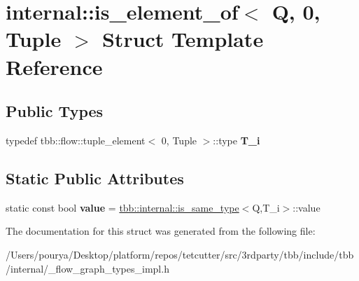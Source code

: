 \hypertarget{structinternal_1_1is__element__of_3_01Q_00_010_00_01Tuple_01_4}{}\section{internal\+:\+:is\+\_\+element\+\_\+of$<$ Q, 0, Tuple $>$ Struct Template Reference}
\label{structinternal_1_1is__element__of_3_01Q_00_010_00_01Tuple_01_4}
\subsection*{Public Types}
\begin{DoxyCompactItemize}
\item 
\hypertarget{structinternal_1_1is__element__of_3_01Q_00_010_00_01Tuple_01_4_a8061f2c0af5043572ab2ee4ad813b4fc}{}typedef tbb\+::flow\+::tuple\+\_\+element$<$ 0, Tuple $>$\+::type {\bfseries T\+\_\+i}\label{structinternal_1_1is__element__of_3_01Q_00_010_00_01Tuple_01_4_a8061f2c0af5043572ab2ee4ad813b4fc}

\end{DoxyCompactItemize}
\subsection*{Static Public Attributes}
\begin{DoxyCompactItemize}
\item 
\hypertarget{structinternal_1_1is__element__of_3_01Q_00_010_00_01Tuple_01_4_aad587ea2a4e069814ce690e0ece27c55}{}static const bool {\bfseries value} = \hyperlink{structtbb_1_1internal_1_1is__same__type}{tbb\+::internal\+::is\+\_\+same\+\_\+type}$<$Q,T\+\_\+i$>$\+::value\label{structinternal_1_1is__element__of_3_01Q_00_010_00_01Tuple_01_4_aad587ea2a4e069814ce690e0ece27c55}

\end{DoxyCompactItemize}


The documentation for this struct was generated from the following file\+:\begin{DoxyCompactItemize}
\item 
/\+Users/pourya/\+Desktop/platform/repos/tetcutter/src/3rdparty/tbb/include/tbb/internal/\+\_\+flow\+\_\+graph\+\_\+types\+\_\+impl.\+h\end{DoxyCompactItemize}
